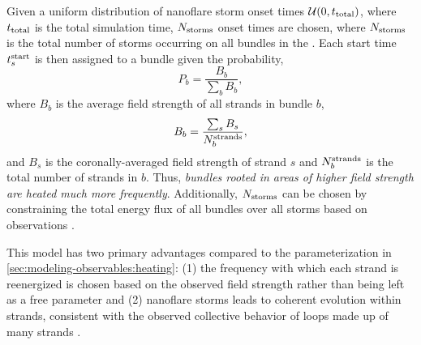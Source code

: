 Given a uniform distribution of nanoflare storm onset times $\mathcal{U}(0,t_\textup{total})$, where $t_\textup{total}$ is the total simulation time, $N_\textup{storms}$ onset times are chosen, where $N_\textup{storms}$ is the total number of storms occurring on all bundles in the \AR{}. Each start time $t_s^\textup{start}$ is then assigned to a bundle given the probability,
\begin{equation*}
    P_b = \frac{B_b}{\sum_b B_b},
\end{equation*}
where $B_b$ is the average field strength of all strands in bundle $b$,
\begin{equation*}
    B_b = \frac{\sum_s B_s}{N^\textup{strands}_b},
\end{equation*}
and $B_s$ is the coronally-averaged field strength of strand $s$ and $N^\textup{strands}_b$ is the total number of strands in $b$. Thus, \textit{bundles rooted in areas of higher field strength are heated much more frequently}. Additionally, $N_\textup{storms}$ can be chosen by constraining the total energy flux of all bundles over all storms based on observations \citep[e.g. \SI{e7}{\erg\per\square\cm\per\second} from][as in \autoref{sec:modeling-observables:heating}]{withbroe_mass_1977}.

This model has two primary advantages compared to the parameterization in \autoref{sec:modeling-observables:heating}: (1) the frequency with which each strand is reenergized is chosen based on the observed field strength rather than being left as a free parameter and (2) nanoflare storms leads to coherent evolution within strands, consistent with the observed collective behavior of loops made up of many strands \citep{klimchuk_key_2015}.

